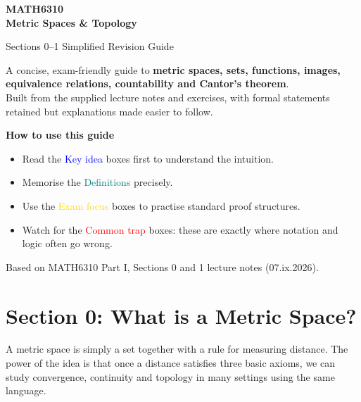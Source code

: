 \documentclass[11pt,a4paper]{article}
\begin{document}
\begin{titlepage}
\centering
\vspace*{2.2cm}
{\Huge\bfseries\color{navy} MATH6310\\[0.25cm] Metric Spaces \& Topology\par}
\vspace{0.6cm}
{\LARGE\color{blue} Sections 0--1 Simplified Revision Guide\par}
\vspace{1.0cm}
\begin{tcolorbox}[width=0.88\textwidth,colback=pale,colframe=navy,arc=3mm,boxrule=0.9pt]
\centering
\large
A concise, exam-friendly guide to \textbf{metric spaces, sets, functions, images, equivalence relations, countability and Cantor's theorem}.\\[0.4cm]
Built from the supplied lecture notes and exercises, with formal statements retained but explanations made easier to follow.
\end{tcolorbox}
\vfill
{\large \textbf{How to use this guide}}\\[0.25cm]
\begin{minipage}{0.82\textwidth}
\begin{itemize}
\item Read the \textcolor{blue}{Key idea} boxes first to understand the intuition.
\item Memorise the \textcolor{teal}{Definitions} precisely.
\item Use the \textcolor{gold}{Exam focus} boxes to practise standard proof structures.
\item Watch for the \textcolor{red}{Common trap} boxes: these are exactly where notation and logic often go wrong.
\end{itemize}
\end{minipage}
\vfill
{\small Based on MATH6310 Part I, Sections 0 and 1 lecture notes (07.ix.2026).}
\end{titlepage}

\tableofcontents
\newpage

\section{Section 0: What is a Metric Space?}

\begin{keybox}
A metric space is simply a set together with a rule for measuring distance. The power of the idea is that once a distance satisfies three basic axioms, we can study convergence, continuity and topology in many settings using the same language.
\end{keybox}
\end{document}
